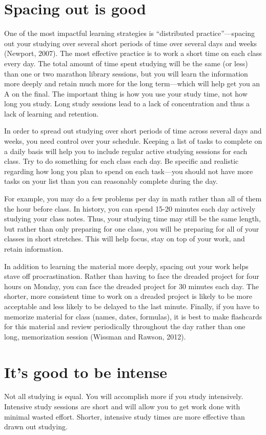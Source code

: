 \documentclass[../main.tex]{subfiles}
\begin{document}
\section{Spacing out is good}
One of the most impactful learning strategies is “distributed practice”—spacing
out your studying over several short periods of time over several days and weeks
(Newport, 2007). The most effective practice is to work a short time on each
class every day. The total amount of time spent studying will be the same (or
less) than one or two marathon library sessions, but you will learn the
information more deeply and retain much more for the long term—which will help
get you an A on the final. The important thing is how you use your study time,
not how long you study. Long study sessions lead to a lack of concentration and
thus a lack of learning and retention.

In order to spread out studying over short periods of time across several days
and weeks, you need control over your schedule. Keeping a list of tasks to
complete on a daily basis will help you to include regular active studying
sessions for each class. Try to do something for each class each day. Be
specific and realistic regarding how long you plan to spend on each task—you
should not have more tasks on your list than you can reasonably complete during
the day.

For example, you may do a few problems per day in math rather than all of them
the hour before class. In history, you can spend 15-20 minutes each day actively
studying your class notes. Thus, your studying time may still be the same
length, but rather than only preparing for one class, you will be preparing for
all of your classes in short stretches. This will help focus, stay on top of
your work, and retain information.

In addition to learning the material more deeply, spacing out your work helps
stave off procrastination. Rather than having to face the dreaded project for
four hours on Monday, you can face the dreaded project for 30 minutes each day.
The shorter, more consistent time to work on a dreaded project is likely to be
more acceptable and less likely to be delayed to the last minute. Finally, if
you have to memorize material for class (names, dates, formulas), it is best to
make flashcards for this material and review periodically throughout the day
rather than one long, memorization session (Wissman and Rawson, 2012).
%
\section{It's good to be intense}
Not all studying is equal. You will accomplish more if you study intensively.
Intensive study sessions are short and will allow you to get work done with
minimal wasted effort. Shorter, intensive study times are more effective than
drawn out studying.
\end{document}
